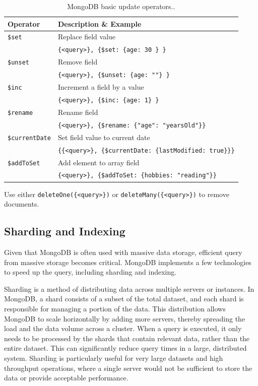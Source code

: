 \begin{table}
	\centering \caption{MongoDB basic update operators..}\label{ch:db:tab:mongodbupdateoperator}
	\begin{tabularx}{\textwidth}{lX}
		\hline
		Operator & Description \& Example \\ \hline
		\verb|$set| & Replace field value \\ & \verb|{<query>}, {$set: {age: 30 } }| \\ \hdashline
		\verb|$unset| & Remove field \\ & \verb|{<query>}, {$unset: {age: ""} }| \\ \hdashline
		\verb|$inc| & Increment a field by a value \\ & \verb|{<query>}, {$inc: {age: 1} }| \\ \hdashline
		\verb|$rename| & Rename field \\ &  \verb|{<query>}, {$rename: {"age": "yearsOld"}}| \\ \hdashline
		\verb|$currentDate| & Set field value to current date \\ & \verb|{{<query>}, {$currentDate: {lastModified: true}}}| \\ \hdashline
		\verb|$addToSet| & Add element to array field \\ & \verb|{<query>}, {$addToSet: {hobbies: "reading"}}| \\
		\hline
	\end{tabularx}
\end{table}

Use either \verb|deleteOne({<query>})| or \verb|deleteMany({<query>})| to remove documents.

\subsection{Sharding and Indexing}

Given that MongoDB is often used with massive data storage, efficient query from massive storage becomes critical. MongoDB implements a few technologies to speed up the query, including sharding and indexing.

Sharding is a method of distributing data across multiple servers or instances. In MongoDB, a shard consists of a subset of the total dataset, and each shard is responsible for managing a portion of the data. This distribution allows MongoDB to scale horizontally by adding more servers, thereby spreading the load and the data volume across a cluster. When a query is executed, it only needs to be processed by the shards that contain relevant data, rather than the entire dataset. This can significantly reduce query times in a large, distributed system. Sharding is particularly useful for very large datasets and high throughput operations, where a single server would not be sufficient to store the data or provide acceptable performance.

